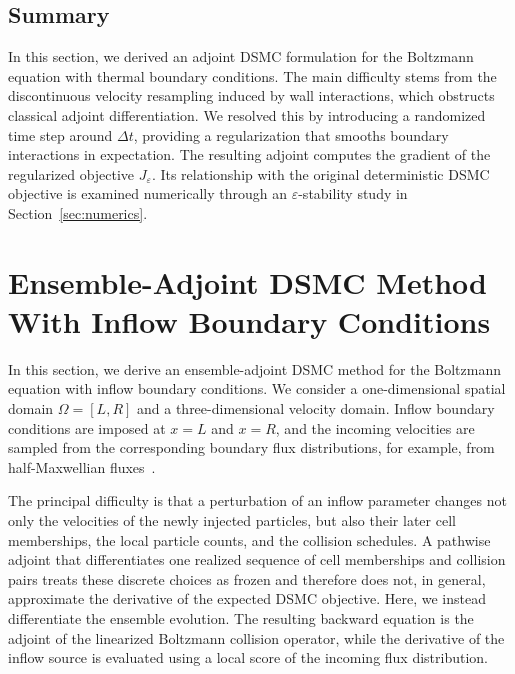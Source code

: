 \documentclass[12pt,nopreprintline]{elsarticle}
\begin{document}
\subsection{Summary}
In this section, we derived an adjoint DSMC formulation for the Boltzmann equation with thermal  boundary conditions. The main difficulty stems from the discontinuous velocity resampling induced by wall interactions, which obstructs classical adjoint differentiation. We resolved this by introducing a randomized time step around $\Delta t$, providing a regularization that smooths boundary interactions in expectation. The resulting adjoint computes the gradient of the regularized objective $J_\varepsilon$. Its relationship with the original deterministic DSMC objective is examined numerically through an $\varepsilon$-stability study in Section~\ref{sec:numerics}.











































\section{Ensemble-Adjoint DSMC Method With Inflow Boundary Conditions}
\label{sec:adjoint_DSMC_inflow}

In this section, we derive an ensemble-adjoint DSMC method for the Boltzmann equation with inflow boundary conditions. We consider a one-dimensional spatial domain $\Omega=[L,R]$ and a three-dimensional velocity domain. Inflow boundary conditions are imposed at $x=L$ and $x=R$, and the incoming velocities are sampled from the corresponding boundary flux distributions, for example, from half-Maxwellian fluxes~\cite[Sec.~6]{pareschi2001introduction}.

The principal difficulty is that a perturbation of an inflow parameter changes not only the velocities of the newly injected particles, but also their later cell memberships, the local particle counts, and the collision schedules. A pathwise adjoint that differentiates one realized sequence of cell memberships and collision pairs treats these discrete choices as frozen and therefore does not, in general, approximate the derivative of the expected DSMC objective. Here, we instead differentiate the ensemble evolution. The resulting backward equation is the adjoint of the linearized Boltzmann collision operator, while the derivative of the inflow source is evaluated using a local score of the incoming flux distribution.
\end{document}
